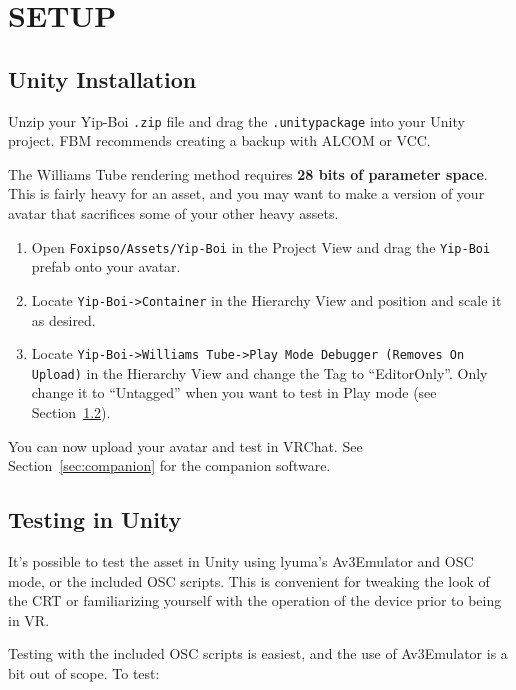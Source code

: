 \documentclass[10pt]{article}
\begin{document}
\section{SETUP}
\label{sec:setup}

\subsection{Unity Installation}

Unzip your Yip-Boi \texttt{.zip} file and drag the \texttt{.unitypackage} into your Unity project. FBM recommends creating a backup with ALCOM or VCC.

\begin{warnbox}[NOTE]
The Williams Tube rendering method requires \textbf{28 bits of parameter space}. This is fairly heavy for an asset, and you may want to make a version of your avatar that sacrifices some of your other heavy assets.
\end{warnbox}

\begin{enumerate}[leftmargin=2em]
  \item Open \texttt{Foxipso/Assets/Yip-Boi} in the Project View and drag the \texttt{Yip-Boi} prefab onto your avatar.
  \item Locate \texttt{Yip-Boi->Container} in the Hierarchy View and position and scale it as desired.
  \item Locate \texttt{Yip-Boi->Williams Tube->Play Mode Debugger (Removes On Upload)} in the Hierarchy View and change the Tag to ``EditorOnly''. Only change it to ``Untagged'' when you want to test in Play mode (see Section~\ref{sec:testing}).
\end{enumerate}

You can now upload your avatar and test in VRChat. See Section~\ref{sec:companion} for the companion software.

\subsection{Testing in Unity}
\label{sec:testing}

It's possible to test the asset in Unity using lyuma's Av3Emulator and OSC mode, or the included OSC scripts. This is convenient for tweaking the look of the CRT or familiarizing yourself with the operation of the device prior to being in VR.

Testing with the included OSC scripts is easiest, and the use of Av3Emulator is a bit out of scope. To test:
\end{document}
